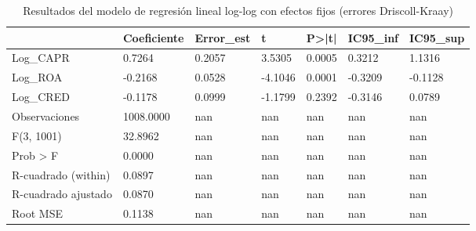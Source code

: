 \begin{table}[htbp]
\centering
\caption{Resultados del modelo de regresión lineal log-log con efectos fijos (errores Driscoll-Kraay)}
\begin{tabular}{lllllll}
\hline
 & Coeficiente & Error\_est & t & P>|t| & IC95\_inf & IC95\_sup \\
\hline
Log\_CAPR & 0.7264 & 0.2057 & 3.5305 & 0.0005 & 0.3212 & 1.1316 \\
Log\_ROA & -0.2168 & 0.0528 & -4.1046 & 0.0001 & -0.3209 & -0.1128 \\
Log\_CRED & -0.1178 & 0.0999 & -1.1799 & 0.2392 & -0.3146 & 0.0789 \\
Observaciones & 1008.0000 & nan & nan & nan & nan & nan \\
F(3, 1001) & 32.8962 & nan & nan & nan & nan & nan \\
Prob > F & 0.0000 & nan & nan & nan & nan & nan \\
R-cuadrado (within) & 0.0897 & nan & nan & nan & nan & nan \\
R-cuadrado ajustado & 0.0870 & nan & nan & nan & nan & nan \\
Root MSE & 0.1138 & nan & nan & nan & nan & nan \\
\hline
\end{tabular}
\label{tab:tabla5b_regresion_EF_loglog}
\end{table}